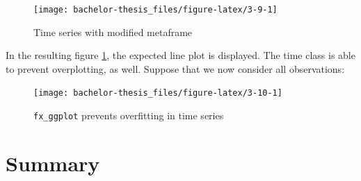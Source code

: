 \documentclass[]{report}
\newenvironment{Shaded}{\begin{snugshade}}{\end{snugshade}}
\newcommand{\KeywordTok}[1]{\textcolor[rgb]{0.13,0.29,0.53}{\textbf{#1}}}
\newcommand{\DataTypeTok}[1]{\textcolor[rgb]{0.13,0.29,0.53}{#1}}
\newcommand{\StringTok}[1]{\textcolor[rgb]{0.31,0.60,0.02}{#1}}
\newcommand{\ControlFlowTok}[1]{\textcolor[rgb]{0.13,0.29,0.53}{\textbf{#1}}}
\newcommand{\OperatorTok}[1]{\textcolor[rgb]{0.81,0.36,0.00}{\textbf{#1}}}
\newcommand{\NormalTok}[1]{#1}
\theoremstyle{definition}
\theoremstyle{definition}
\theoremstyle{definition}
\theoremstyle{remark}
\begin{document}
\begin{figure}

{\centering \texttt{[image: bachelor-thesis\_files/figure-latex/3-9-1]} 

}

\caption{Time series with modified metaframe}\label{fig:3-9}
\end{figure}



In the resulting figure \ref{fig:3-9}, the expected line plot is
displayed. The time class is able to prevent overplotting, as well.
Suppose that we now consider all observations:

\begin{Shaded}
\end{Shaded}

\begin{figure}

{\centering \texttt{[image: bachelor-thesis\_files/figure-latex/3-10-1]} 

}

\caption{\texttt{fx\_ggplot} prevents overfitting in time series}\label{fig:3-10}
\end{figure}



\hypertarget{summary}{\section{Summary}\label{summary}}
\end{document}
